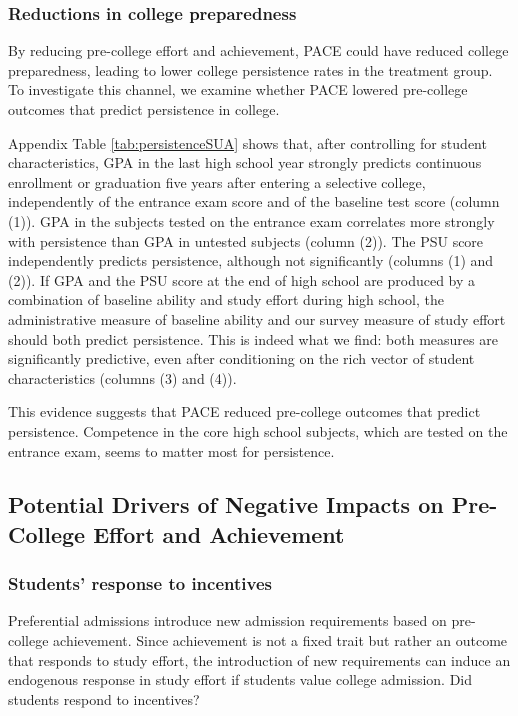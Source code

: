 \subsubsection{Reductions in college preparedness}\label{sec:reductions_college_preparedness}
By reducing pre-college effort and achievement, PACE could have reduced college preparedness, leading to lower college persistence rates in the treatment group. To investigate this channel, we examine whether PACE lowered pre-college outcomes that predict persistence in college.\par 
 Appendix Table \ref{tab:persistenceSUA}  shows that, after controlling for student characteristics, GPA in the last high school year strongly predicts continuous enrollment or graduation five years after entering a selective college, independently of the entrance exam score and of the baseline test score (column (1)). GPA in the subjects tested on the entrance exam correlates more strongly with persistence than GPA in untested subjects (column (2)). The PSU score independently predicts persistence, although not significantly (columns (1) and (2)). If GPA and the PSU score at the end of high school are produced by a combination of baseline ability and study effort during high school, the administrative measure of baseline ability and our survey measure of study effort should both predict persistence. This is indeed what we find: both measures are significantly predictive, even after conditioning on the rich vector of student characteristics (columns (3) and (4)). \par 
 This evidence suggests that PACE reduced pre-college outcomes that predict persistence. Competence in the core high school subjects, which are tested on the entrance exam, seems to matter most for persistence. \par 


 \subsection{Potential Drivers of Negative Impacts on Pre-College Effort and Achievement}


 
 \subsubsection{Students' response to incentives}\label{sec:beliefs}


Preferential admissions introduce new admission requirements based on pre-college achievement. Since achievement is not a fixed trait but rather an outcome that responds to study effort, the introduction of new requirements can induce an endogenous response in study effort if students value college admission. Did students respond to incentives?\par 



